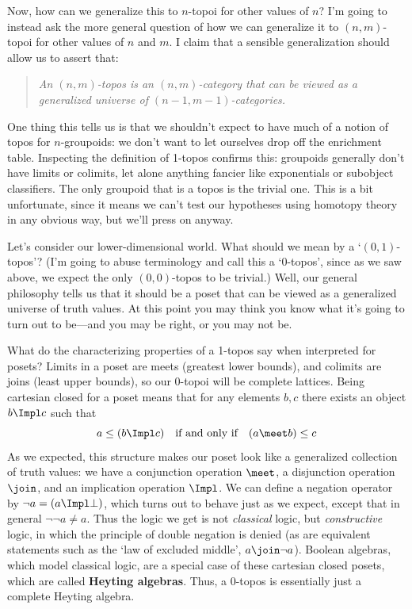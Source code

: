 \documentclass{amsart}
\begin{document}
Now, how can we generalize this to $n$-topoi for other values of $n$?
I'm going to instead ask the more general question of how we can
generalize it to $(n,m)$-topoi for other values of $n$ and $m$.  I
claim that a sensible generalization should allow us to assert that:

\begin{quote}
  \emph{An $(n,m)$-topos is an $(n,m)$-category that can be viewed as
    a generalized universe of $(n-1,m-1)$-categories.}
\end{quote}

One thing this tells us is that we shouldn't expect to have much of a
notion of topos for $n$-groupoids: we don't want to let ourselves drop
off the enrichment table.  Inspecting the definition of 1-topos
confirms this: groupoids generally don't have limits or colimits, let
alone anything fancier like exponentials or subobject classifiers.
The only groupoid that is a topos is the trivial one.  This is a bit
unfortunate, since it means we can't test our hypotheses using
homotopy theory in any obvious way, but we'll press on anyway.

Let's consider our lower-dimensional world.  What should we mean by a
`$(0,1)$-topos'?  (I'm going to abuse terminology and call this a
`0-topos', since as we saw above, we expect the only $(0,0)$-topos to
be trivial.)  Well, our general philosophy tells us that it should be
a poset that can be viewed as a generalized universe of truth values.
At this point you may think you know what it's going to turn out to
be---and you may be right, or you may not be.

What do the characterizing properties of a 1-topos say when
interpreted for posets?  Limits in a poset are meets (greatest lower
bounds), and colimits are joins (least upper bounds), so our 0-topoi
will be complete lattices.  Being cartesian closed for a poset means
that for any elements $b,c$ there exists an object  $b\Impl c$ such
that
\[
a \le (b\Impl c) \quad\text{if and only if}\quad (a\meet b) \le c
\]
As we expected, this structure makes our poset look like a generalized
collection of truth values: we have a conjunction operation $\meet$, a
disjunction operation $\join$, and an implication operation $\Impl$.
We can define a negation operator by $\neg a = (a \Impl \bot)$, which
turns out to behave just as we expect, except that in general
$\neg\neg a \neq a$.  Thus the logic we get is not \emph{classical}
logic, but \emph{constructive} logic, in which the principle of double
negation is denied (as are equivalent statements such as the `law of
excluded middle', $a\join \neg a$).  Boolean algebras, which model
classical logic, are a special case of these cartesian closed posets,
which are called \textbf{Heyting algebras}.  Thus, a 0-topos is
essentially just a complete Heyting algebra.
\end{document}
